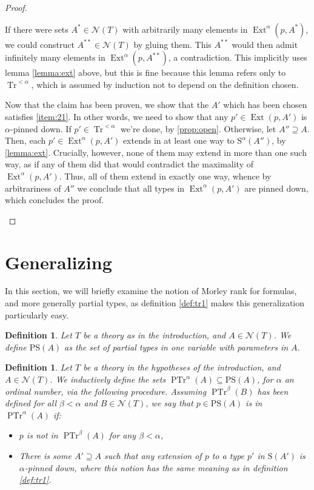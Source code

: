 \documentclass{article}
\newtheorem{definition}[theorem]{Definition}
\theoremstyle{nonumberplain}
\newtheorem{proof}{Proof}
\newcommand{\calN}{\mathcal{N}}
\newcommand{\Stone}{\mathrm{S}}
\newcommand{\PStone}{\mathrm{PS}}
\DeclareMathOperator{\Tr}{Tr}
\DeclareMathOperator{\PTr}{PTr}
\DeclareMathOperator{\Ext}{Ext}
\begin{document}
\begin{proof}
\begin{itemize}
If there were sets $A^* \in \calN(T)$ with arbitrarily many elements in $\Ext^\alpha(p,A^*)$, we could construct $A^{**} \in\calN(T)$ by gluing them. This $A^{**}$ would then admit infinitely many elements in $\Ext^\alpha(p,A^{**})$, a contradiction. This implicitly uses lemma \ref{lemma:ext} above, but this is fine because this lemma refers only to $\Tr^{<\alpha}$, which is assumed by induction not to depend on the definition chosen.

Now that the claim has been proven, we show that the $A'$ which has been chosen satisfies \ref{item:21}. In other words, we need to show that any $p' \in \Ext(p,A')$ is $\alpha$-pinned down. If $p' \in \Tr^{<\alpha}$ we're done, by \ref{prop:open}. Otherwise, let $A'' \supseteq A$. Then, each $p' \in \Ext^\alpha(p,A')$ extends in at least one way to $\Stone^\alpha(A'')$, by \ref{lemma:ext}. Crucially, however, none of them may extend in more than one such way, as if any of them did that would contradict the maximality of $\Ext^\alpha(p,A')$. Thus, all of them extend in exactly one way, whence by arbitrariness of $A''$ we conclude that all types in $\Ext^\alpha(p,A')$ are pinned down, which concludes the proof.
\end{itemize}
\end{proof}

\section{Generalizing}\label{sec:gen}

In this section, we will briefly examine the notion of Morley rank for formulas, and more generally partial types, as definition \ref{def:tr1} makes this generalization particularly easy.

\begin{definition}
Let $T$ be a theory as in the introduction, and $A \in \calN(T)$. We define $\PStone(A)$ as the set of partial types in one variable with parameters in $A$.
\end{definition}

\begin{definition}\label{def:trgen}
Let $T$ be a theory in the hypotheses of the introduction, and $A \in \calN(T)$. We inductively define the sets $\PTr^\alpha(A) \subseteq \PStone(A)$, for $\alpha$ an ordinal number, via the following procedure. Assuming $\PTr^\beta(B)$ has been defined for all $\beta < \alpha$ and $B \in \calN(T)$, we say that $p \in \PStone(A)$ is in $\PTr^\alpha(A)$ if:
\begin{itemize}
\item $p$ is not in $\PTr^\beta(A)$ for any $\beta < \alpha$,
\item There is some $A' \supseteq A$ such that any extension of $p$ to a type $p'$ in $\Stone(A')$ is $\alpha$-pinned down, where this notion has the same meaning as in definition \ref{def:tr1}.
\end{itemize}
\end{definition}
\end{document}
